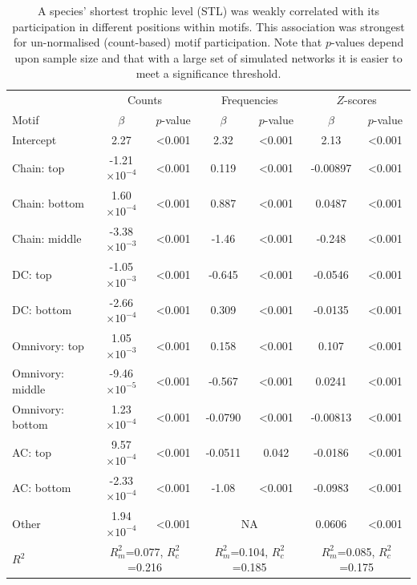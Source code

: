 \documentclass[12pt]{article}
\begin{document}
			\begin{table}[hb!]
    			\caption{A species' shortest trophic level (STL) was weakly correlated with its participation in different positions within motifs. This association was strongest for un-normalised (count-based) motif participation. Note that $p$-values depend upon sample size and that with a large set of simulated networks it is easier to meet a significance threshold.}
    			\label{tab:positions_vs_STL}
    			\begin{tabular}{l | c c | c c | c c}
    			& \multicolumn{2}{c|}{Counts} & \multicolumn{2}{c|}{Frequencies} & \multicolumn{2}{c}{$Z$-scores} \\
    			Motif & $\beta$ & $p$-value & $\beta$ & $p$-value & $\beta$ & $p$-value \\
    			\hline
                Intercept	&	2.27	&	\textless0.001	&	2.32	&	\textless0.001	&	2.13	&	\textless0.001	\\
                Chain: top	&	-1.21$\times10^{-4}$	&	\textless0.001	&	0.119	&	\textless0.001	&	-0.00897	&	\textless0.001	\\
                Chain: bottom	&	1.60$\times10^{-4}$	&	\textless0.001	&	0.887	&	\textless0.001	&	0.0487	&	\textless0.001	\\
                Chain: middle	&	-3.38$\times10^{-3}$	&	\textless0.001	&	-1.46	&	\textless0.001	&	-0.248	&	\textless0.001	\\
                DC: top	&	-1.05$\times10^{-3}$	&	\textless0.001	&	-0.645	&	\textless0.001	&	-0.0546	&	\textless0.001	\\
                DC: bottom	&	-2.66$\times10^{-4}$	&	\textless0.001	&	0.309	&	\textless0.001	&	-0.0135	&	\textless0.001	\\
                Omnivory: top	&	1.05$\times10^{-3}$	&	\textless0.001	&	0.158	&	\textless0.001	&	0.107	&	\textless0.001	\\
                Omnivory: middle	&	-9.46$\times10^{-5}$ &	\textless0.001	&	-0.567	&	\textless0.001	&	0.0241	&	\textless0.001	\\
                Omnivory: bottom	&	1.23$\times10^{-4}$	&	\textless0.001	&	-0.0790	&	\textless0.001	&	-0.00813	&	\textless0.001	\\
                AC: top	&	9.57$\times10^{-4}$	&	\textless0.001	&	-0.0511	&	0.042	&	-0.0186	&	\textless0.001	\\
                AC: bottom	&	-2.33$\times10^{-4}$	&	\textless0.001	&	-1.08	&	\textless0.001	&	-0.0983	&	\textless0.001	\\
                Other	&	1.94$\times10^{-4}$	&	\textless0.001	&	\multicolumn{2}{c|}{NA}			&	0.0606	&	\textless0.001	\\
    			\hline
    			$R^2$ & \multicolumn{2}{c|}{\tiny{$R^2_m$=0.077, $R^2_c$=0.216}} & 
    			\multicolumn{2}{c|}{\tiny{$R^2_m$=0.104, $R^2_c$=0.185}} & 
    			\multicolumn{2}{c}{\tiny{$R^2_m$=0.085, $R^2_c$=0.175}} \\
    			\end{tabular}
    			\end{table}
\end{document}
